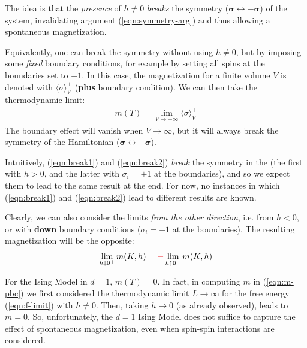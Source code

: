 \documentclass[../template.tex]{subfiles}
\begin{document}
\medskip

The idea is that the \textit{presence} of $h \neq 0$ \textit{breaks} the symmetry ($\bm{\sigma} \leftrightarrow -\bm{\sigma}$) of the system, invalidating argument (\ref{eqn:symmetry-arg}) and thus allowing a spontaneous magnetization.

\medskip

Equivalently, one can break the symmetry without using $h \neq 0$, but by imposing some \textit{fixed} boundary conditions, for example by setting all spins at the boundaries set to $+1$. In this case, the magnetization for a finite volume $V$ is denoted with $\langle \sigma \rangle_V^+$ (\textbf{plus} boundary condition). We can then take the thermodynamic limit:
\begin{align}\label{eqn:break2}
    m(T) = \lim_{V \to +\infty} \langle \sigma \rangle_V^+
\end{align}
The boundary effect will vanish when $V \to \infty$, but it will always break the symmetry of the Hamiltonian ($\bm{\sigma} \leftrightarrow -\bm{\sigma}$).

\medskip

Intuitively, (\ref{eqn:break1}) and (\ref{eqn:break2}) \textit{break} the symmetry in the  (the first with $h>0$, and the latter with $\sigma_i = +1$ at the boundaries), and so we expect them to lead to the same result at the end. For now, no instances in which (\ref{eqn:break1}) and (\ref{eqn:break2}) lead to different results are known.

\medskip

Clearly, we can also consider the limits \textit{from the other direction}, i.e. from $h < 0$, or with \textbf{down} boundary conditions ($\sigma_i = -1$ at the boundaries). The resulting magnetization will be the opposite:
\begin{align*}
    \lim_{h \downarrow 0^+} m(K,h) = \textcolor{Red}{-} \lim_{h \uparrow 0^-} m(K,h)
\end{align*} 

For the Ising Model in $d=1$, $m(T) = 0$. In fact, in computing $m$ in (\ref{eqn:m-pbc}) we first considered the thermodynamic limit $L \to \infty$ for the free energy (\ref{eqn:f-limit}) with $h \neq 0$. Then, taking $h \to 0$ (as already observed), leads to $m = 0$. So, unfortunately, the $d=1$ Ising Model does not suffice to capture the effect of spontaneous magnetization, even when spin-spin interactions are considered. 

\medskip
\end{document}

